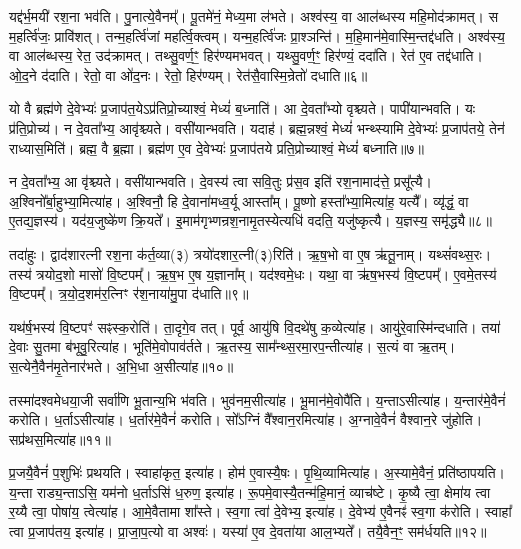 यद्द॑र्भ॒मयी॑ रश॒ना भव॑ति।
पु॒नात्ये॒वैनम्᳚।
पू॒तमे॑नं॒ मेध्य॒मा ल॑भते।
अश्व॑स्य॒ वा आल॑ब्धस्य महि॒मोद॑क्रामत्।
स म॒हर्त्वि॑जः॒ प्रावि॑शत्।
तन्म॒हर्त्वि॑जां महर्त्वि॒क्त्वम्।
यन्म॒हर्त्वि॑जः प्रा॒श्ञन्ति॑।
म॒हि॒मान॑मे॒वास्मि॒न्तद्द॑धति।
अश्व॑स्य॒ वा आल॑ब्धस्य॒ रेत॒ उद॑क्रामत्।
तथ्सु॒वर्ण॒ꣳ॒ हिर॑ण्यमभवत्।
यथ्सु॒वर्ण॒ꣳ॒ हिर॑ण्यं॒ ददा॑ति।
रेत॑ ए॒व तद्द॑धाति।
ओ॒द॒ने द॑दाति।
रेतो॒ वा ओ॑द॒नः।
रेतो॒ हिर॑ण्यम्।
रेत॑सै॒वास्मि॒न्रेतो॑ दधाति॥६॥\ip\anuvakamend[द॒धा॒ति॒ रु॒न्धे॒ द॒र्भा अ॑भव॒थ्षट् च॑]

यो वै ब्रह्म॑णे दे॒वेभ्यः॑ प्र॒जा\-प॑त॒ये\-ऽप्र॑तिप्रो॒च्याश्वं॒ मेध्यं॑ ब॒ध्नाति॑।
आ दे॒वता᳚भ्यो वृश्च्यते।
पापी॑यान्भवति।
यः प्र॑ति॒प्रोच्य॑।
न दे॒वता᳚भ्य॒ आवृ॑श्च्यते।
वसी॑यान्भवति।
यदाह॑।
ब्रह्म॒न्नश्वं॒ मेध्यं॑ भन्थ्स्यामि दे॒वेभ्यः॑ प्र॒जा\-प॑तये॒ तेन॑ राध्यास॒मिति॑।
ब्रह्म॒ वै ब्र॒ह्मा।
ब्रह्म॑ण ए॒व दे॒वेभ्यः॑ प्र॒जा\-प॑तये प्रति॒प्रोच्याश्वं॒ मेध्यं॑ बध्नाति॥७॥\ip

न दे॒वता᳚भ्य॒ आ वृ॑श्च्यते।
वसी॑यान्भवति।
दे॒वस्य॑ त्वा सवि॒तुः प्र॑स॒व इति॑ रश॒नामाद॑त्ते॒ प्रसू᳚त्यै।
अ॒श्विनो᳚र्बा॒हुभ्या॒मित्या॑ह।
अ॒श्विनौ॒ हि दे॒वाना॑मध्व॒र्यू आस्ता᳚म्।
पू॒ष्णो हस्ता᳚भ्या॒मित्या॑ह॒ यत्यै᳚।
व्यृ॑द्धं॒ वा ए॒तद्य॒ज्ञस्य॑।
यद॑य॒जुष्के॑ण क्रि॒यते᳚।
इ॒माम॑गृभ्णन्रश॒नामृ॒तस्ये\-त्यधि॑ वदति॒ यजु॑ष्कृत्यै।
य॒ज्ञस्य॒ समृ॑द्ध्यै॥८॥\ip

तदा॑हुः।
द्वाद॑शारत्नी रश॒ना क॑र्त॒व्या(३) त्रयो॑दशार॒त्नी(३)\-रिति॑।
ऋ॒ष॒भो वा ए॒ष ऋ॑तू॒नाम्।
यथ्सं॑वथ्स॒रः।
तस्य॑ त्रयोद॒शो मासो॑ वि॒ष्टपम्᳚।
ऋ॒ष॒भ ए॒ष य॒ज्ञाना᳚म्।
यद॑श्वमे॒धः।
यथा॒ वा ऋ॑ष॒भस्य॑ वि॒ष्टपम्᳚।
ए॒वमे॒तस्य॑ वि॒ष्टपम्᳚।
त्र॒यो॒द॒शम॑र॒त्निꣳ र॑श॒नाया॑मु॒पा द॑धाति॥९॥\ip

यथ॑र्\mbox{}ष॒भस्य॑ वि॒ष्टपꣳ॑ सꣴस्क॒रोति॑।
ता॒दृगे॒व तत्।
पूर्व॒ आयु॑षि वि॒दथे॑षु क॒व्येत्या॑ह।
आयु॑रे॒वास्मि॑न्दधाति।
तया॑ दे॒वाः सु॒तमा ब॑भूवु॒रित्या॑ह।
भूति॑मे॒वोपाव॑र्तते।
ऋ॒तस्य॒ साम᳚न्थ्स॒रमा॒रप॒न्तीत्या॑ह।
स॒त्यं वा ऋ॒तम्।
स॒त्येनै॒वैन॑मृ॒तेनार॑भते।
अ॒भि॒धा अ॒सीत्या॑ह॥१०॥\ip

तस्मा॑दश्वमेधया॒जी सर्वा॑णि भू॒तान्य॒भि भ॑वति।
भुव॑नम॒सी\-त्या॑ह।
भू॒मान॑मे॒वोपै॑ति।
य॒न्ता\-ऽसीत्या॑ह।
य॒न्तार॑मे॒वैनं॑ करोति।
ध॒र्ता\-ऽसीत्या॑ह।
ध॒र्तार॑मे॒वैनं॑ करोति।
सो᳚ऽग्निं वै᳚श्वान॒रमित्या॑ह।
अ॒ग्नावे॒वैनं॑ वैश्वान॒रे जु॑होति।
सप्र॑थस॒मित्या॑ह॥११॥\ip

प्र॒जयै॒वैनं॑ प॒शुभिः॑ प्रथयति।
स्वाहा॑कृत॒ इत्या॑ह।
होम॑ ए॒वास्यै॒षः।
पृ॒थि॒व्यामित्या॑ह।
अ॒स्यामे॒वैनं॒ प्रति॑\-ष्ठापयति।
य॒न्ता राड्य॒न्ताऽसि॒ यम॑नो ध॒र्ताऽसि॑ ध॒रुण॒ इत्या॑ह।
रू॒पमे॒वास्यै॒तन्म॑हि॒मानं॒ व्याच॑ष्टे।
कृ॒ष्यै त्वा॒ क्षेमा॑य त्वा र॒य्यै त्वा॒ पोषा॑य॒ त्वेत्या॑ह।
आ॒\-मे॒वैतामा शा᳚स्ते।
स्व॒गा त्वा॑ दे॒वेभ्य॒ इत्या॑ह।
दे॒वेभ्य॑ ए॒वैनꣴ॑ स्व॒गा क॑रोति।
स्वाहा᳚ त्वा प्र॒जा\-प॑तय॒ इत्या॑ह।
प्रा॒जा॒प॒त्यो वा अश्वः॑।
यस्या॑ ए॒व दे॒वता॑या आल॒भ्यते᳚।
तयै॒वैन॒ꣳ॒ सम॑र्धयति॥१२॥\ip\anuvakamend[ब॒ध्ना॒ति॒ समृ॑द्ध्या उ॒पाद॑धात्य॒सीत्या॑ह॒ सप्र॑थस॒मित्या॑ह दे॒वेभ्य॒ इत्या॑ह॒ पञ्च॑ च]

